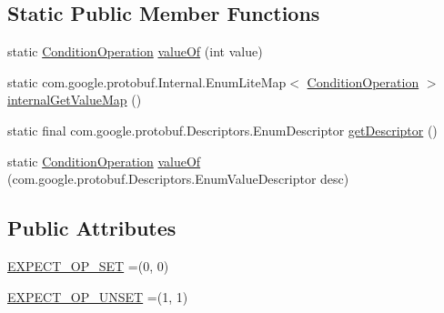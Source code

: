 \subsection*{Static Public Member Functions}
\begin{DoxyCompactItemize}
\item 
static \mbox{\hyperlink{enumcom_1_1mysql_1_1cj_1_1x_1_1protobuf_1_1_mysqlx_expect_1_1_open_1_1_condition_1_1_condition_operation}{Condition\+Operation}} \mbox{\hyperlink{enumcom_1_1mysql_1_1cj_1_1x_1_1protobuf_1_1_mysqlx_expect_1_1_open_1_1_condition_1_1_condition_operation_aaaf9d5b6cf79ef769a3183d63b7c4559}{value\+Of}} (int value)
\item 
static com.\+google.\+protobuf.\+Internal.\+Enum\+Lite\+Map$<$ \mbox{\hyperlink{enumcom_1_1mysql_1_1cj_1_1x_1_1protobuf_1_1_mysqlx_expect_1_1_open_1_1_condition_1_1_condition_operation}{Condition\+Operation}} $>$ \mbox{\hyperlink{enumcom_1_1mysql_1_1cj_1_1x_1_1protobuf_1_1_mysqlx_expect_1_1_open_1_1_condition_1_1_condition_operation_a7b769f57d35e05ea1063ed5c55a70b89}{internal\+Get\+Value\+Map}} ()
\item 
static final com.\+google.\+protobuf.\+Descriptors.\+Enum\+Descriptor \mbox{\hyperlink{enumcom_1_1mysql_1_1cj_1_1x_1_1protobuf_1_1_mysqlx_expect_1_1_open_1_1_condition_1_1_condition_operation_a1834e7f55e6abe6cb246df1ead9631a5}{get\+Descriptor}} ()
\item 
static \mbox{\hyperlink{enumcom_1_1mysql_1_1cj_1_1x_1_1protobuf_1_1_mysqlx_expect_1_1_open_1_1_condition_1_1_condition_operation}{Condition\+Operation}} \mbox{\hyperlink{enumcom_1_1mysql_1_1cj_1_1x_1_1protobuf_1_1_mysqlx_expect_1_1_open_1_1_condition_1_1_condition_operation_a5b1c8b1e481a241ad14579c751c7a418}{value\+Of}} (com.\+google.\+protobuf.\+Descriptors.\+Enum\+Value\+Descriptor desc)
\end{DoxyCompactItemize}
\subsection*{Public Attributes}
\begin{DoxyCompactItemize}
\item 
\mbox{\hyperlink{enumcom_1_1mysql_1_1cj_1_1x_1_1protobuf_1_1_mysqlx_expect_1_1_open_1_1_condition_1_1_condition_operation_af7ff7aeb56ef9c3b991dffe432c2b75c}{E\+X\+P\+E\+C\+T\+\_\+\+O\+P\+\_\+\+S\+ET}} =(0, 0)
\item 
\mbox{\hyperlink{enumcom_1_1mysql_1_1cj_1_1x_1_1protobuf_1_1_mysqlx_expect_1_1_open_1_1_condition_1_1_condition_operation_ad2cc943e3997ea5c5b8f8e900081dfec}{E\+X\+P\+E\+C\+T\+\_\+\+O\+P\+\_\+\+U\+N\+S\+ET}} =(1, 1)
\end{DoxyCompactItemize}
